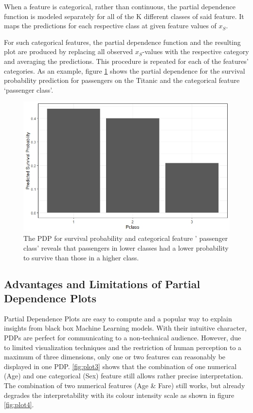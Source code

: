 \documentclass[
]{krantz}
\begin{document}
When a feature is categorical, rather than continuous, the partial dependence function is modeled separately for all of the K different classes of said feature. It maps the predictions for each respective class at given feature values of \(x_S\).\citep{hastie2013elements}

For such categorical features, the partial dependence function and the resulting plot are produced by replacing all observed \(x_S\)-values with the respective category and averaging the predictions. This procedure is repeated for each of the features' categories.\citep{molnar2019} As an example, figure \ref{fig:plot2} shows the partial dependence for the survival probability prediction for passengers on the Titanic and the categorical feature `passenger class'.

\begin{figure}

{\centering \includegraphics[width=0.8\linewidth]{images/PDP_Plot_2} 

}

\caption{The PDP for survival probability and categorical feature ' passenger class' reveals that passengers in lower classes had a lower probability to survive than those in a higher class.}\label{fig:plot2}
\end{figure}

\hypertarget{advantages-and-limitations-of-partial-dependence-plots}{%
\subsection{Advantages and Limitations of Partial Dependence Plots}\label{advantages-and-limitations-of-partial-dependence-plots}}

Partial Dependence Plots are easy to compute and a popular way to explain insights from black box Machine Learning models. With their intuitive character, PDPs are perfect for communicating to a non-technical audience. However, due to limited visualization techniques and the restriction of human perception to a maximum of three dimensions, only one or two features can reasonably be displayed in one PDP.\citep{molnar2019} \ref{fig:plot3} shows that the combination of one numerical (Age) and one categorical (Sex) feature still allows rather precise interpretation. The combination of two numerical features (Age \& Fare) still works, but already degrades the interpretability with its colour intensity scale as shown in figure \ref{fig:plot4}.
\end{document}
